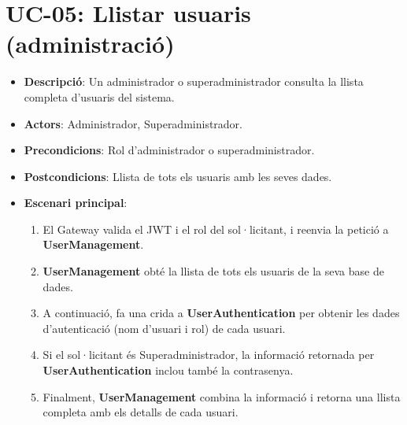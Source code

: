 \section{UC-05: Llistar usuaris (administració)}
\begin{itemize}
    \item \textbf{Descripció}: Un administrador o superadministrador consulta la llista completa d'usuaris del sistema.
    \item \textbf{Actors}: Administrador, Superadministrador.
    \item \textbf{Precondicions}: Rol d'administrador o superadministrador.
    \item \textbf{Postcondicions}: Llista de tots els usuaris amb les seves dades.
    \item \textbf{Escenari principal}:
    \begin{enumerate}
        \item El Gateway valida el JWT i el rol del sol·licitant, i reenvia la petició a \textbf{UserManagement}.
        \item \textbf{UserManagement} obté la llista de tots els usuaris de la seva base de dades.
        \item A continuació, fa una crida a \textbf{UserAuthentication} per obtenir les dades d'autenticació (nom d'usuari i rol) de cada usuari.
        \item Si el sol·licitant és Superadministrador, la informació retornada per \textbf{UserAuthentication} inclou també la contrasenya.
        \item Finalment, \textbf{UserManagement} combina la informació i retorna una llista completa amb els detalls de cada usuari.
    \end{enumerate}
\end{itemize}

